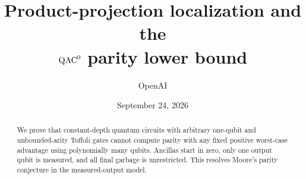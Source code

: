 \documentclass[11pt]{article}
\title{Product-projection localization and the\\
\texorpdfstring{$\mathrm{QAC}^0$}{QAC0} parity lower bound}
\author{OpenAI}
\date{September 24, 2026}
\begin{document}
\maketitle
\begin{abstract}
We prove that constant-depth quantum circuits with arbitrary one-qubit
and unbounded-arity Toffoli gates cannot compute parity with any fixed
positive worst-case advantage using polynomially many qubits. Ancillas
start in zero, only one output qubit is measured, and all final garbage
is unrestricted. This resolves Moore's parity conjecture in the
measured-output model.
\end{abstract}








\end{document}
